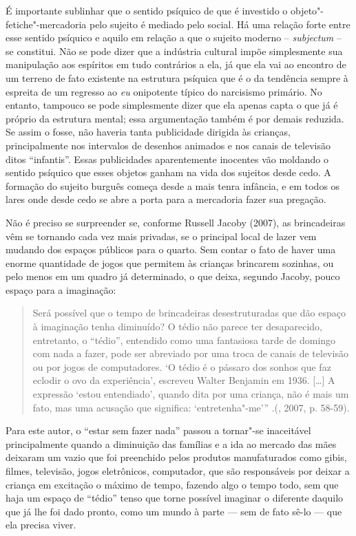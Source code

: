 É importante sublinhar que o sentido psíquico de que é investido o
objeto"-fetiche"-mercadoria pelo sujeito é mediado pelo social. Há uma
relação forte entre esse sentido psíquico e aquilo em relação a que o
sujeito moderno -- \emph{subjectum} -- se constitui. Não se pode dizer
que a indústria cultural impõe simplesmente sua manipulação aos
espíritos em tudo contrários a ela, já que ela vai ao encontro de um
terreno de fato existente na estrutura psíquica que é o da tendência
sempre à espreita de um regresso ao \emph{eu} onipotente típico do
narcisismo primário. No entanto, tampouco se pode simplesmente dizer que
ela apenas capta o que já é próprio da estrutura mental; essa
argumentação também é por demais reduzida. Se assim o fosse, não haveria
tanta publicidade dirigida às crianças, principalmente nos intervalos de
desenhos animados e nos canais de televisão ditos ``infantis''. Essas
publicidades aparentemente inocentes vão moldando o sentido psíquico que
esses objetos ganham na vida dos sujeitos desde cedo. A formação do
sujeito burguês começa desde a mais tenra infância, e em todos os lares
onde desde cedo se abre a porta para a mercadoria fazer sua pregação.

Não é preciso se surpreender se, conforme Russell Jacoby (2007), as
brincadeiras vêm se tornando cada vez mais privadas, se o principal
local de lazer vem mudando dos espaços públicos para o quarto. Sem
contar o fato de haver uma enorme quantidade de jogos que permitem às
crianças brincarem sozinhas, ou pelo menos em um quadro já determinado,
o que deixa, segundo Jacoby, pouco espaço para a imaginação:

\begin{quote}
Será possível que o tempo de brincadeiras desestruturadas que dão espaço
à imaginação tenha diminuído? O tédio não parece ter desaparecido,
entretanto, o ``tédio'', entendido como uma fantasiosa tarde de domingo
com nada a fazer, pode ser abreviado por uma troca de canais de
televisão ou por jogos de computadores. `O tédio é o pássaro dos sonhos
que faz eclodir o ovo da experiência', escreveu Walter Benjamin em 1936.
[\ldots{}] A expressão `estou entendiado', quando dita por uma criança,
não é mais um fato, mas uma acusação que significa: `entretenha"-me'''
.(, 2007, p. 58-59).
\end{quote}

Para este autor, o ``estar sem fazer nada'' passou a tornar"-se
inaceitável principalmente quando a diminuição das famílias e a ida ao
mercado das mães deixaram um vazio que foi preenchido pelos produtos
manufaturados como gibis, filmes, televisão, jogos eletrônicos,
computador, que são responsáveis por deixar a
criança em excitação o máximo de tempo, fazendo algo o tempo todo, sem
que haja um espaço de ``tédio'' tenso que torne possível imaginar o
diferente daquilo que já lhe foi dado pronto, como um mundo à parte ---
sem de fato sê-lo --- que ela precisa viver.

